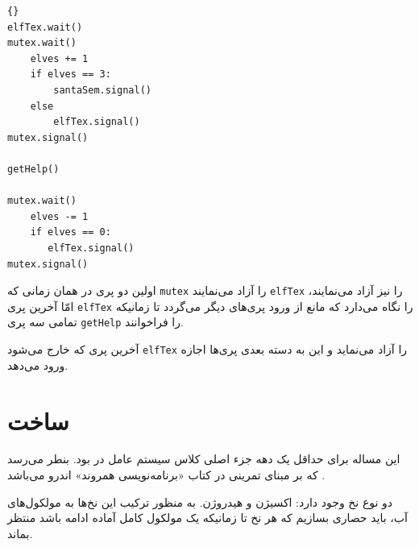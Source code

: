 \documentclass{book}
\begin{document}
\newpage
\begin{latin}
\begin{latin}
\begin{lstlisting}[title=\rl{راه حل مساله بابا نوئل (پری‌ها)}]{}
elfTex.wait()
mutex.wait()
    elves += 1
    if elves == 3:
        santaSem.signal()
    else
        elfTex.signal()
mutex.signal()

getHelp()

mutex.wait()
    elves -= 1
    if elves == 0:
       elfTex.signal()
mutex.signal()
\end{lstlisting}
\end{latin}
\end{latin}

    اولین دو پری  در همان زمانی که {\tt mutex} را  آزاد می‌نمایند {\tt elfTex} را نیز آزاد می‌نمایند،‌ امّا آخرین پری  {\tt elfTex} را نگاه می‌دارد که 
    مانع از ورود پری‌های دیگر می‌گردد تا زمانیکه تمامی سه پری {\tt getHelp} را فراخوانند. 

    آخرین پری که خارج می‌شود {\tt elfTex} را آزاد می‌نماید و این به دسته‌ بعدی پری‌ها اجازه ورود می‌دهد. 
    

\newpage
\section{ساخت  }
\label{water}

    این مساله برای حداقل یک دهه جزء اصلی کلاس سیستم عامل در   بود. بنطر می‌رسد که بر مبنای تمرینی 
    در کتاب «برنامه‌نویسی همروند» اندرو می‌باشد \cite{andrews}.

    دو نوع نخ وجود دارد: اکسیژن و هیدروژن. به منظور ترکیب این نخ‌ها به مولکول‌های آب، باید حصاری بسازیم که هر نخ تا زمانیکه یک مولکول کامل 
    آماده ادامه باشد منتظر بماند. 
\end{document}
